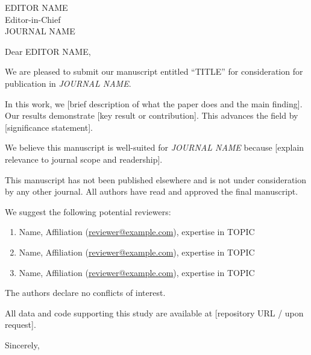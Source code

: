 \documentclass[11pt,a4paper]{letter}
\date{\today}
\begin{document}
\begin{letter}{
    EDITOR NAME\\
    Editor-in-Chief\\
    JOURNAL NAME\\
}

\opening{Dear EDITOR NAME,}

We are pleased to submit our manuscript entitled ``TITLE'' for consideration for publication in \textit{JOURNAL NAME}.

In this work, we [brief description of what the paper does and the main finding]. Our results demonstrate [key result or contribution]. This advances the field by [significance statement].

We believe this manuscript is well-suited for \textit{JOURNAL NAME} because [explain relevance to journal scope and readership].

This manuscript has not been published elsewhere and is not under consideration by any other journal. All authors have read and approved the final manuscript.


We suggest the following potential reviewers:
\begin{enumerate}
    \item Name, Affiliation (\href{mailto:reviewer@example.com}{reviewer@example.com}), expertise in TOPIC
    \item Name, Affiliation (\href{mailto:reviewer@example.com}{reviewer@example.com}), expertise in TOPIC
    \item Name, Affiliation (\href{mailto:reviewer@example.com}{reviewer@example.com}), expertise in TOPIC
\end{enumerate}


The authors declare no conflicts of interest.

All data and code supporting this study are available at [repository URL / upon request].


\closing{Sincerely,}

\end{letter}
\end{document}
